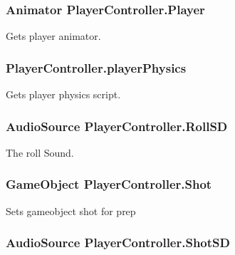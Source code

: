 \hypertarget{classPlayerController_af6d2c371d77ff294a3840e6e26608e24}{
\subsubsection[{Player}]{\setlength{\rightskip}{0pt plus 5cm}Animator Player\-Controller.\-Player}}\label{classPlayerController_af6d2c371d77ff294a3840e6e26608e24}


Gets player animator. 

\hypertarget{classPlayerController_a039e255582f5fb656710b996fce4667e}{
\subsubsection[{player\-Physics}]{ Player\-Controller.\-player\-Physics}}\label{classPlayerController_a039e255582f5fb656710b996fce4667e}


Gets player physics script. 

\hypertarget{classPlayerController_a205f3898c18c6338d4e12f33222d90f5}{
\subsubsection[{Roll\-S\-D}]{\setlength{\rightskip}{0pt plus 5cm}Audio\-Source Player\-Controller.\-Roll\-S\-D}}\label{classPlayerController_a205f3898c18c6338d4e12f33222d90f5}


The roll Sound. 

\hypertarget{classPlayerController_aabcb743694c264c111b2aa92c6f04dca}{
\subsubsection[{Shot}]{\setlength{\rightskip}{0pt plus 5cm}Game\-Object Player\-Controller.\-Shot}}\label{classPlayerController_aabcb743694c264c111b2aa92c6f04dca}


Sets gameobject shot for prep 

\hypertarget{classPlayerController_aa985596607cf22753896610372c00fa7}{
\subsubsection[{Shot\-S\-D}]{\setlength{\rightskip}{0pt plus 5cm}Audio\-Source Player\-Controller.\-Shot\-S\-D}}\label{classPlayerController_aa985596607cf22753896610372c00fa7}


